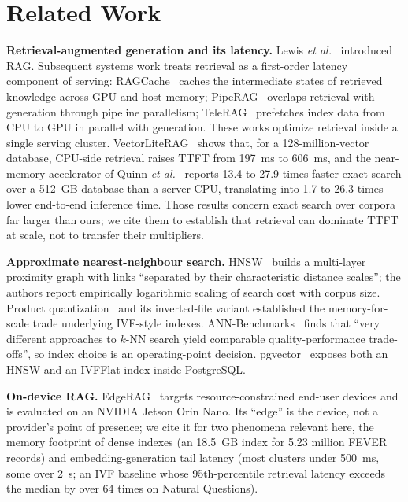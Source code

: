 \documentclass[conference]{IEEEtran}
\begin{document}
\section{Related Work}

\textbf{Retrieval-augmented generation and its latency.} Lewis \emph{et al.}~\cite{lewis2020}
introduced RAG. Subsequent systems work treats retrieval as a first-order latency component of
serving: RAGCache~\cite{ragcache} caches the intermediate states of retrieved knowledge across GPU
and host memory; PipeRAG~\cite{piperag} overlaps retrieval with generation through pipeline
parallelism; TeleRAG~\cite{telerag} prefetches index data from CPU to GPU in parallel with
generation. These works optimize retrieval inside a single serving cluster.
VectorLiteRAG~\cite{vectorlite} shows that, for a 128-million-vector database, CPU-side retrieval
raises TTFT from 197~ms to 606~ms, and the near-memory accelerator of Quinn
\emph{et al.}~\cite{accelrag} reports 13.4 to 27.9 times faster exact search over a 512~GB
database than a server CPU, translating into 1.7 to 26.3 times lower end-to-end inference time.
Those results concern exact search over corpora far larger than ours; we cite them to establish
that retrieval can dominate TTFT at scale, not to transfer their multipliers.

\textbf{Approximate nearest-neighbour search.} HNSW~\cite{malkov2018} builds a multi-layer
proximity graph with links ``separated by their characteristic distance scales''; the authors
report empirically logarithmic scaling of search cost with corpus size. Product
quantization~\cite{jegou2011} and its inverted-file variant established the memory-for-scale
trade underlying IVF-style indexes. ANN-Benchmarks~\cite{annbench} finds that ``very different
approaches to $k$-NN search yield comparable quality-performance trade-offs'', so index choice is
an operating-point decision. pgvector~\cite{pgvector} exposes both an HNSW and an IVFFlat index
inside PostgreSQL.

\textbf{On-device RAG.} EdgeRAG~\cite{edgerag} targets resource-constrained end-user devices and
is evaluated on an NVIDIA Jetson Orin Nano. Its ``edge'' is the device, not a provider's point of
presence; we cite it for two phenomena relevant here, the memory footprint of dense indexes (an
18.5~GB index for 5.23 million FEVER records) and embedding-generation tail latency (most clusters
under 500~ms, some over 2~s; an IVF baseline whose 95th-percentile retrieval latency exceeds the
median by over 64 times on Natural Questions).
\end{document}
